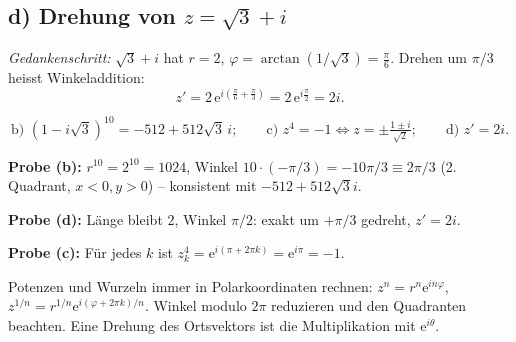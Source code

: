 \subsection*{d) Drehung von $z=\sqrt3+i$}
\emph{Gedankenschritt:} $\sqrt3+i$ hat $r=2$, $\varphi=\arctan(1/\sqrt3)
=\tfrac\pi6$. Drehen um $\pi/3$ heisst Winkeladdition:
\begin{equation*}
  z'=2\,\mathrm e^{i(\frac\pi6+\frac\pi3)}
  =2\,\mathrm e^{i\frac\pi2}=2i .
\end{equation*}

\begin{ergebnis}
\begin{equation*}
  \text{b) } (1-i\sqrt3)^{10}=-512+512\sqrt3\,i;\qquad
  \text{c) } z^4=-1 \iff z=\pm\tfrac{1\pm i}{\sqrt2};\qquad
  \text{d) } z'=2i .
\end{equation*}
\end{ergebnis}

\begin{kontrolle}
\textbf{Probe (b):} $r^{10}=2^{10}=1024$, Winkel $10\cdot(-\pi/3)=-10\pi/3
\equiv 2\pi/3$ (2. Quadrant, $x<0,y>0$) -- konsistent mit
$-512+512\sqrt3 i$. \checkmark

\textbf{Probe (d):} Länge bleibt $2$, Winkel $\pi/2$: exakt um $+\pi/3$
gedreht, $z'=2i$. \checkmark

\textbf{Probe (c):} Für jedes $k$ ist $z_k^4=\mathrm e^{i(\pi+2\pi k)}
=\mathrm e^{i\pi}=-1$. \checkmark
\end{kontrolle}

\begin{merksatz}
Potenzen und Wurzeln immer in Polarkoordinaten rechnen:
$z^n=r^n\mathrm e^{in\varphi}$, $z^{1/n}=r^{1/n}\mathrm e^{i(\varphi+2\pi k)/n}$.
Winkel modulo $2\pi$ reduzieren und den Quadranten beachten. Eine Drehung
des Ortsvektors ist die Multiplikation mit $\mathrm e^{i\theta}$.
\end{merksatz}
